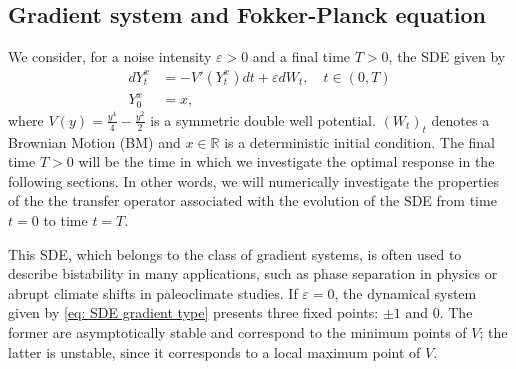 \documentclass{amsart}
\begin{document}
\subsection{Gradient system and Fokker-Planck equation}
\label{sec: sde and fpe}
We consider, for a noise intensity $\varepsilon>0$ and a final time $T>0$, the SDE given by
\begin{equation}
\begin{split}
    dY_t^x &= - V'(Y_t^x)dt + \varepsilon dW_t, \quad t \in (0,T)\\
    Y_0^x &= x,
\end{split}
\label{eq: SDE gradient type}
\end{equation}
where $V(y) = \frac{y^4}{4}- \frac{y^2}{2}$ is a symmetric double well potential. $(W_t)_t$ denotes a Brownian Motion (BM) and $x \in \mathbb{R}$ is a deterministic initial condition. The final time $T>0$ will be the time in which we investigate the optimal response in the following sections. {In other words, we will numerically investigate the properties of the the transfer operator associated with the evolution of the SDE from time $t=0$ to time $t = T$.}

This SDE, which belongs to the class of gradient systems, is often used to describe bistability in many applications, such as phase separation in physics or abrupt climate shifts in paleoclimate studies. If $\varepsilon = 0$, the dynamical system given by \eqref{eq: SDE gradient type} presents three fixed points: $\pm 1$ and $0$. The former are asymptotically stable and correspond to the minimum points of $V$; the latter is unstable, since it corresponds to a local maximum point of $V$.
\end{document}
